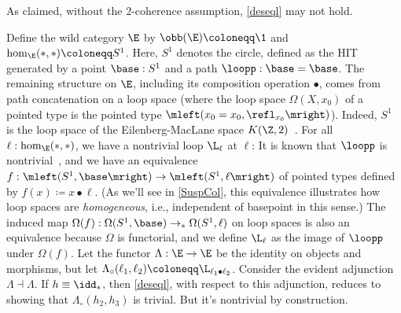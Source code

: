 \documentclass{lmcs}
\theoremstyle{definition}\newtheorem{note}[thm]{Note}
\begin{document}
\begin{exa} \label{eq-counter}
As claimed, without the $2$-coherence assumption, \eqref{deseql} may not hold. 

Define the wild category $\E$ by $\obb(\E) \coloneqq \1$ and $\hom_{\E}(\ast, \ast) \coloneqq S^1$. Here, $S^1$ denotes the circle, defined as the HIT generated by 
a point $\base : S^1$ and a path $\loopp : \base = \base$. The remaining structure on $\E$, including its composition operation $\bullet$, comes from path concatenation on a loop space (where the loop space $\Omega(X,x_0)$ of a pointed type is the pointed type $\mleft(x_0=x_0, \refl_{x_0}\mright)$). Indeed, $S^1$ is the loop space of the Eilenberg-MacLane space $K(\Z, 2)$~\cite{EMS}. For all $\ell : \hom_{\E}(\ast, \ast)$, we have a nontrivial loop $\L_{\ell}$ at $\ell$: It is known that $\loopp$ is nontrivial~\cite[Lemma 6.4.1]{Uni13}, and we have an equivalence $f : \mleft(S^1, \base \mright) \to \mleft(S^1 , \ell\mright)$ of pointed types defined by $f(x) \coloneqq x \bullet \ell$. (As we'll see in \cref{SuspCol}, this equivalence illustrates how loop spaces are \emph{homogeneous}, i.e., independent of basepoint in this sense.) The induced map $\Omega(f) : \Omega(S^1, \base) \to_{\ast} \Omega(S^1,\ell) $ on loop spaces is also an equivalence because $\Omega$ is functorial, and we define $\L_{\ell}$ as the image of $\loopp$ under $\Omega(f)$.
Let the functor $\Lambda : \E \to \E$ be the identity on objects and morphisms, but let $\Lambda_{\circ}(\ell_1, \ell_2) \coloneqq \L_{\ell_1 \bullet \ell_2}$.
Consider the evident adjunction $\Lambda \dashv \Lambda$. If $h \equiv \idd_{\ast}$, then \eqref{deseql}, with respect to this adjunction, reduces to showing that $\Lambda_{\circ} (h_2, h_3)$ is trivial. But it's nontrivial by construction.
\end{exa}
\end{document}
